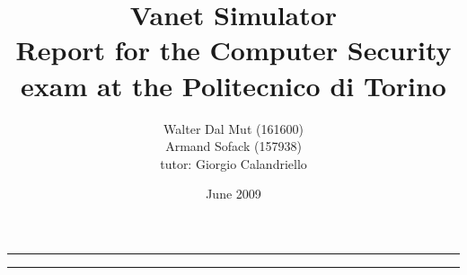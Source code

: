 \documentclass[a4paper,12pt]{article}
\begin{document}
\title{Vanet Simulator
\\
{\normalsize Report for the Computer Security exam at the Politecnico di Torino}
}
\author{Walter Dal Mut (161600)\\Armand Sofack (157938)
\\
{\normalsize tutor: Giorgio Calandriello}
}
\date{June 2009}
\maketitle

\vfill

\rule{\textwidth}{1pt}

\tableofcontents

\rule{\textwidth}{1pt}

\vfill









\end{document}
